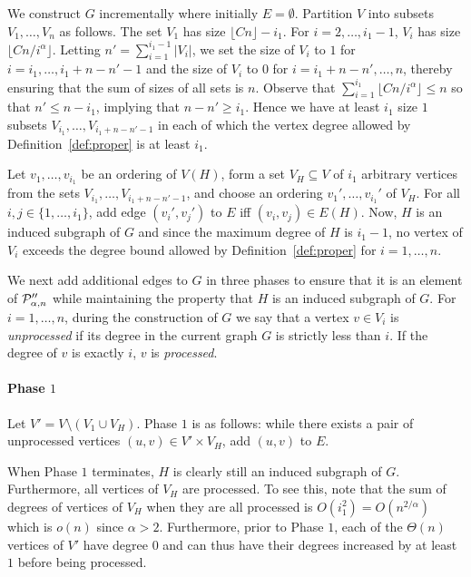 We construct $G$ incrementally where initially $E = \emptyset$. Partition $V$ into subsets $V_1,\ldots,V_n$ as follows. The set $V_1$ has size $\lfloor Cn\rfloor - i_1$. For $i = 2,\ldots,i_1-1$, $V_i$ has size $\lfloor Cn/i^\alpha\rfloor$. Letting $n' = \sum_{i = 1}^{i_1-1} \vert V_i\vert$, we set the size of $V_i$ to $1$ for $i = i_1,\ldots,i_1+n-n'-1$ and the size of $V_i$ to $0$ for $i = i_1+n-n',\ldots,n$, thereby ensuring that the sum of sizes of all sets is $n$. Observe that $\sum_{i = 1}^{i_1}\lfloor Cn/i^\alpha\rfloor\leq n$ so that $n'\leq n - i_1$, implying that $n-n'\geq i_1$. Hence we have at least $i_1$ size $1$ subsets $V_{i_1},\ldots,V_{i_1+n-n'-1}$ in each of which the vertex degree allowed by Definition~\ref{def:proper} is at least $i_1$.

Let $v_1,\ldots,v_{i_1}$ be an ordering of $V(H)$, form a set $V_H\subseteq V$ of $i_1$ arbitrary vertices from the sets $V_{i_1},\ldots,V_{i_1+n-n'-1}$, and choose an ordering $v_1',\ldots,v_{i_1}'$ of $V_H$. For all $i,j\in\{1,\ldots,i_1\}$, add edge $(v_i',v_j')$ to $E$ iff $(v_i,v_j)\in E(H)$. Now, $H$ is an induced subgraph of $G$ and since the maximum degree of $H$ is $i_1-1$, no vertex of $V_i$ exceeds the degree bound allowed by Definition~\ref{def:proper} for $i = 1,\ldots,n$.

We next add additional edges to $G$ in three phases to ensure that it is an element of $ \mathcal{P}''_{\alpha,n}$ while maintaining the property that $H$ is an induced subgraph of $G$. For $i = 1,\ldots,n$, during the construction of $G$ we say that a vertex $v\in V_i$ is \emph{unprocessed} if its degree in the current graph $G$ is strictly less than $i$. If the degree of $v$ is exactly $i$, $v$ is \emph{processed}.

\vspace{-0.1cm}
\paragraph{Phase $1$}
Let $V' = V\setminus (V_1\cup V_H)$. Phase $1$ is as follows: while there exists a pair of unprocessed vertices $(u,v)\in V'\times V_H$, add $(u,v)$ to $E$.

When Phase $1$ terminates, $H$ is clearly still an induced subgraph of $G$. Furthermore, all vertices of $V_H$ are processed. To see this, note that the sum of degrees of vertices of $V_H$ when they are all processed is $O(i_1^2) = O(n^{2/\alpha})$ which is $o(n)$ since $\alpha > 2$. Furthermore, prior to Phase $1$, each of the $\Theta(n)$ vertices of $V'$ have degree $0$ and can thus have their degrees increased by at least $1$ before being processed.
\vspace{-0.1cm}
